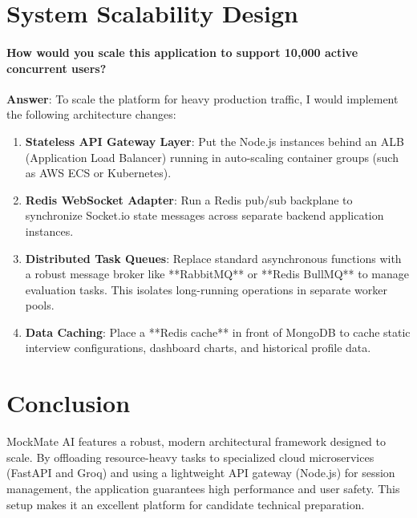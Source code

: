 \documentclass[11pt,a4paper]{article}
\begin{document}
\section{System Scalability Design}

\paragraph{How would you scale this application to support 10,000 active concurrent users?}
\textbf{Answer}: To scale the platform for heavy production traffic, I would implement the following architecture changes:
\begin{enumerate}
    \item \textbf{Stateless API Gateway Layer}: Put the Node.js instances behind an ALB (Application Load Balancer) running in auto-scaling container groups (such as AWS ECS or Kubernetes).
    \item \textbf{Redis WebSocket Adapter}: Run a Redis pub/sub backplane to synchronize Socket.io state messages across separate backend application instances.
    \item \textbf{Distributed Task Queues}: Replace standard asynchronous functions with a robust message broker like **RabbitMQ** or **Redis BullMQ** to manage evaluation tasks. This isolates long-running operations in separate worker pools.
    \item \textbf{Data Caching}: Place a **Redis cache** in front of MongoDB to cache static interview configurations, dashboard charts, and historical profile data.
\end{enumerate}

\section{Conclusion}
MockMate AI features a robust, modern architectural framework designed to scale. By offloading resource-heavy tasks to specialized cloud microservices (FastAPI and Groq) and using a lightweight API gateway (Node.js) for session management, the application guarantees high performance and user safety. This setup makes it an excellent platform for candidate technical preparation.
\end{document}
